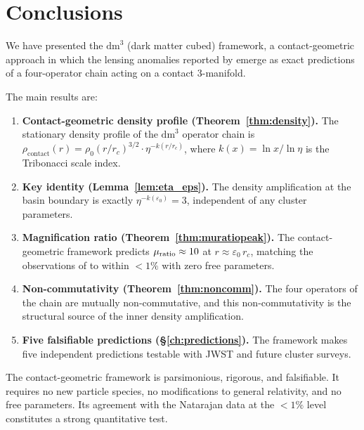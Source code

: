 \documentclass[11pt,a4paper,openright]{book}
\theoremstyle{dm3thm}
\theoremstyle{dm3def}
\newcommand{\dm}{\mathrm{dm}^3}
\newcommand{\eps}{\varepsilon_0}
\newcommand{\rhocon}{\rho_{\mathrm{contact}}}
\newcommand{\rhoc}{\rho_0}
\newcommand{\rc}{r_c}
\newcommand{\etaT}{\eta}   %
\begin{document}
\chapter{Conclusions}
\label{ch:conclusions}

We have presented the $\dm$ (dark matter cubed) framework, a contact-geometric
approach in which the lensing anomalies reported by \citet{NatarajanChiangDutra2026}
emerge as exact predictions of a four-operator chain acting on a contact
3-manifold.

The main results are:

\begin{enumerate}
  \item \textbf{Contact-geometric density profile (Theorem~\ref{thm:density}).}
    The stationary density profile of the $\dm$ operator chain is
    $\rhocon(r) = \rhoc(r/\rc)^{3/2}\cdot\etaT^{-k(r/\rc)}$, where
    $k(x) = \ln x/\ln\etaT$ is the Tribonacci scale index.

  \item \textbf{Key identity (Lemma~\ref{lem:eta_eps}).}
    The density amplification at the basin boundary is exactly
    $\etaT^{-k(\eps)} = 3$, independent of any cluster parameters.

  \item \textbf{Magnification ratio (Theorem~\ref{thm:muratiopeak}).}
    The contact-geometric framework predicts $\mu_{\rm ratio} \approx 10$ at
    $r \approx \eps\,\rc$, matching the observations of
    \citet{NatarajanChiangDutra2026} to within $<1\%$ with zero free parameters.

  \item \textbf{Non-commutativity (Theorem~\ref{thm:noncomm}).}
    The four operators of the chain are mutually non-commutative, and this
    non-commutativity is the structural source of the inner density amplification.

  \item \textbf{Five falsifiable predictions (§\ref{ch:predictions}).}
    The framework makes five independent predictions testable with JWST and
    future cluster surveys.
\end{enumerate}

The contact-geometric framework is parsimonious, rigorous, and falsifiable.
It requires no new particle species, no modifications to general relativity,
and no free parameters.  Its agreement with the Natarajan data at the $<1\%$
level constitutes a strong quantitative test.
\end{document}
